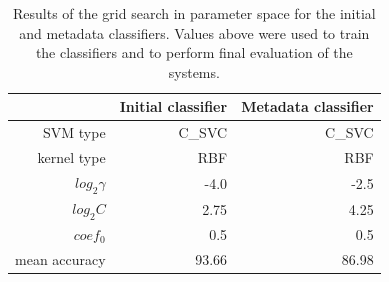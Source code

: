 \begin{table}[th!]
\centering
\begin{tabular}{@{}rrr@{}}
\toprule
& Initial classifier & Metadata classifier \\
\midrule
SVM type & C\_SVC & C\_SVC \\ 
kernel type & RBF & RBF \\
$log_{2}\gamma$ & -4.0 & -2.5 \\ 
$log_{2}C$ & 2.75 & 4.25 \\
$coef_0$ & 0.5 & 0.5 \\
\midrule
mean accuracy & 93.66 & 86.98 \\
\bottomrule
\end{tabular}
\caption{Results of the grid search in parameter space for the initial and metadata classifiers. Values above were used to train the classifiers and to perform final evaluation of the systems.}
\label{tab:classifier_parameters}
\end{table}

